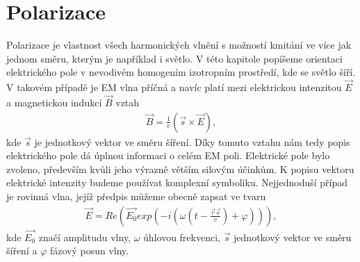 \chapter{Polarizace}
Polarizace je vlastnost všech harmonických vlnění s možností kmitání ve více jak jednom směru, kterým je například i světlo. V této kapitole popíšeme orientaci elektrického pole v nevodivém homogením izotropním prostředí, kde se světlo šíří. V takovém případě je EM vlna příčná a navíc platí mezi elektrickou intenzitou $\vec{E}$ a magnetickou indukcí $\vec{B}$ vztah
\begin{eqnarray}
\vec{B}=\frac{1}{v}(\vec{s}\times\vec{E}),
\end{eqnarray}
kde $\vec{s}$ je jednotkový vektor ve směru šíření. Díky tomuto vztahu nám tedy popis elektrického pole dá úplnou informaci o celém EM poli. Elektrické pole bylo zvoleno, především kvůli jeho výrazně větším silovým účinkům.
K popisu vektoru elektrické intenzity budeme používat komplexní symboliku. Nejjednoduší případ je rovinná vlna, jejíž předpis můžeme obecně zapsat ve tvaru
\begin{eqnarray}
\vec{E}=Re(\vec{E_0}exp(-i(\omega(t-\frac{\vec{r}\vec{s}}{v})+\varphi))),
\label{rovinna vlna}
\end{eqnarray}
kde $\vec{E_0}$ značí amplitudu vlny, $\omega$ úhlovou frekvenci, $\vec{s}$ jednotkový vektor ve směru šíření a $\varphi$ fázový posun vlny.

